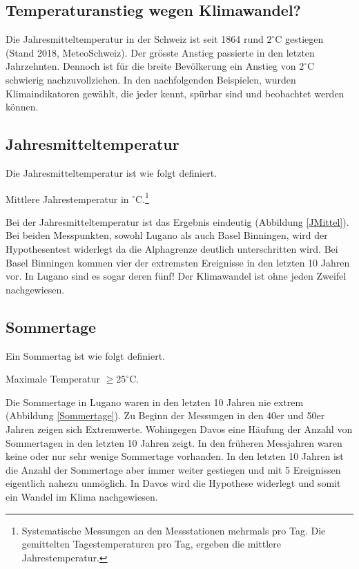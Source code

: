 \begin{refsection}
\section{Temperaturanstieg wegen Klimawandel?}
Die Jahresmitteltemperatur in der Schweiz ist seit 1864 rund $2^{\circ}$C gestiegen (Stand 2018, MeteoSchweiz). Der grösste Anstieg passierte in den letzten Jahrzehnten. Dennoch ist für die breite Bevölkerung ein Anstieg von $2^{\circ}$C schwierig nachzuvollziehen.
In den nachfolgenden Beispielen, wurden Klimaindikatoren gewählt, die jeder kennt, spürbar sind und beobachtet werden können.

\subsection{Jahresmitteltemperatur}
Die Jahresmitteltemperatur ist wie folgt definiert.

\begin{definition}
Mittlere Jahrestemperatur in $^{\circ}$C.\footnote{%
Systematische Messungen an den Messstationen mehrmals pro Tag. Die gemittelten Tagestemperaturen pro Tag, ergeben die mittlere Jahrestemperatur.}
\end{definition}

Bei der Jahresmitteltemperatur ist das Ergebnis eindeutig (Abbildung \ref{JMittel}). Bei beiden Messpunkten, sowohl Lugano als auch Basel Binningen, wird der Hypothesentest widerlegt da die Alphagrenze deutlich unterschritten wird. Bei Basel Binningen kommen vier der extremsten Ereignisse in den letzten 10 Jahren vor. In Lugano sind es sogar deren fünf! Der Klimawandel ist ohne jeden Zweifel nachgewiesen.


\subsection{Sommertage}
Ein Sommertag ist wie folgt definiert.

\begin{definition}
Maximale Temperatur $\ge 25^{\circ}$C.
\end{definition}

Die Sommertage in Lugano waren in den letzten 10 Jahren nie extrem (Abbildung \ref{Sommertage}). Zu Beginn der Messungen in den 40er und 50er Jahren zeigen sich Extremwerte. Wohingegen Davos eine Häufung der Anzahl von Sommertagen in den letzten 10 Jahren zeigt. In den früheren Messjahren waren keine oder nur sehr wenige Sommertage vorhanden. In den letzten 10 Jahren ist die Anzahl der Sommertage aber immer weiter gestiegen und mit 5 Ereignissen eigentlich nahezu unmöglich. In Davos wird die Hypothese widerlegt und somit ein Wandel im Klima nachgewiesen.



\end{refsection}
